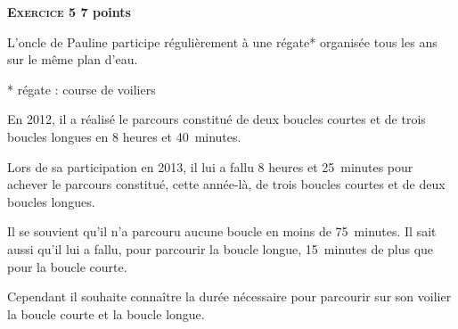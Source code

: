 \textbf{\textsc{Exercice 5} \hfill 7 points}

\medskip 

L'oncle de Pauline participe régulièrement à une régate* organisée tous les ans sur le même plan d'eau. 

* régate : course de voiliers

\medskip 

En 2012, il a réalisé le parcours constitué de deux boucles courtes et de trois boucles longues en 8 heures et 40~minutes. 

Lors de sa participation en 2013, il lui a fallu 8 heures et 25~minutes pour achever le parcours constitué, cette année-là, de trois boucles courtes et de deux boucles longues. 

Il se souvient qu'il n'a parcouru aucune boucle en moins de 75~minutes. Il sait aussi qu'il lui a fallu, pour parcourir la boucle longue, 15~minutes de plus que pour la boucle courte. 

Cependant il souhaite connaître la durée nécessaire pour parcourir sur son voilier la boucle courte et la boucle longue.

\medskip 

